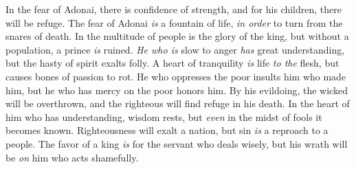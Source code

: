 \begin{biblechapter}
\verse In the fear of Adonai, there is confidence of strength, 
and for his children, there will be refuge.
\verse The fear of Adonai \textit{is} a fountain of life, 
\textit{in order} to turn from the snares of death.
\verse In the multitude of people is the glory of the king, 
but without a population, a prince \textit{is} ruined.
\verse \textit{He who is} slow to anger \textit{has} great understanding, 
but the hasty of spirit exalts folly.
\verse A heart of tranquility \textit{is} life \textit{to the} flesh, 
but causes bones of passion to rot.
\verse He who oppresses the poor insults him who made him, 
but he who has mercy on the poor honors him.
\verse By his evildoing, the wicked will be overthrown, 
and the righteous will find refuge in his death.
\verse In the heart of him who has understanding, wisdom rests, 
but \textit{even} in the midst of fools it becomes known.
\verse Righteousness will exalt a nation, 
but sin \textit{is} a reproach to a people.
\verse The favor of a king \textit{is} for the servant who deals wisely, 
but his wrath will be \textit{on} him who acts shamefully.
\end{biblechapter}

